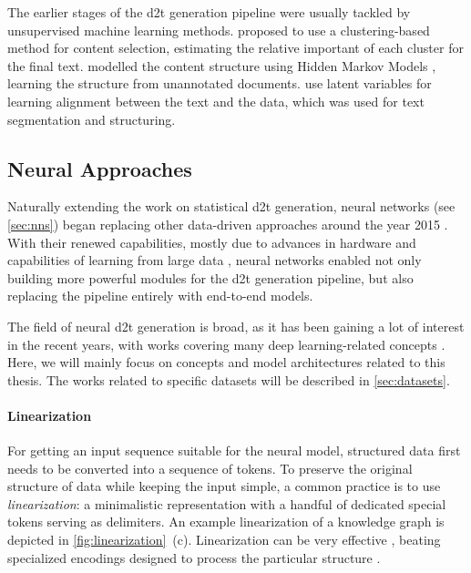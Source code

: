 {The earlier stages of the \ac{d2t} generation pipeline were usually tackled by unsupervised machine learning methods. \citet{duboue2003statistical} proposed to use a clustering-based method for content selection, estimating the relative important of each cluster for the final text. \citet{barzilay2004catching} modelled the content structure using Hidden Markov Models \cite{baum1966statistical}, learning the structure from unannotated documents. \citet{liang2009learning} use latent variables for learning alignment between the text and the data, which was used for text segmentation and structuring.

\subsection{Neural Approaches}
\label{sec:neural-d2t}
Naturally extending the work on statistical \ac{d2t} generation, neural networks (see \autoref{sec:nns}) began replacing other data-driven approaches around the year 2015 \cite{dusekTrainingNaturalLanguage2015,wen2015toward}. With their renewed capabilities, mostly due to advances in hardware \cite{hooker2021hardware} and capabilities of learning from large data \cite{lecun2015deep}, neural networks enabled not only building more powerful modules for the \ac{d2t} generation pipeline, but also replacing the pipeline entirely with end-to-end models.

The field of neural \ac{d2t} generation is broad, as it has been gaining a lot of interest in the recent years, with works covering many deep learning-related concepts \cite{sharmaInnovationsNeuralDatatotext2022, lin2023survey}. Here, we will mainly focus on concepts and model architectures related to this thesis. The works related to specific datasets will be described in \autoref{sec:datasets}.


\paragraph{Linearization} For getting an input sequence suitable for the neural model, structured data first needs to be converted into a sequence of tokens. To preserve the original structure of data while keeping the input simple, a common practice is to use \emph{linearization}: a minimalistic representation with a handful of dedicated special tokens serving as delimiters. An example linearization of a knowledge graph is depicted in \autoref{fig:linearization}~(c). Linearization can be very effective \cite{yang2020improving,hoyle2021promoting,xieUnifiedSKGUnifyingMultiTasking2022}, beating specialized encodings designed to process the particular structure \cite{marcheggianiDeepGraphConvolutional2018,koncel-kedziorskiTextGenerationKnowledge2019}.

}
